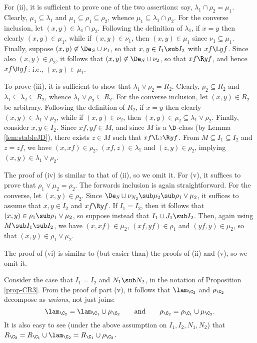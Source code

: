 For (ii), it is sufficient to prove one of the two assertions: say, $\lambda_1\cap \rho_2=\mu_1$.
Clearly, $\mu_1\subseteq \lambda_1$ and $\mu_1\subseteq \rho_1\subseteq \rho_2$, whence $\mu_1\subseteq \lambda_1\cap\rho_2$.
For the converse inclusion, let $(x,y)\in \lambda_1\cap\rho_2$.
Following the definition of $\lambda_1$, if $x=y$ then clearly $(x,y)\in \mu_1$, while if $(x,y)\in\nu_1$, then $(x,y)\in \mu_1$ since $\nu_1\subseteq\mu_1$.
Finally, suppose $(x,y)\not\in\De_S\cup\nu_1$, so that $x,y\in I_1\sub I_2$ with $xf\L yf$.
%
Since also $(x,y)\in\rho_2$, it follows that $(x,y)\not\in\De_S\cup\nu_2$, so that $xf\R yf$, and hence $xf\H yf$: i.e., $(x,y)\in\mu_1$.

To prove (iii), it is sufficient to show that $\lambda_1\vee\rho_2=R_2$.
Clearly, $\rho_2\subseteq R_2$ and $\lambda_1\subseteq \lambda_2\subseteq R_2$, whence $\lambda_1\vee\rho_2\subseteq R_2$.
For the converse inclusion, let $(x,y)\in R_2$ be arbitrary.
Following the definition of $R_2$, if $x=y$ then clearly $(x,y)\in \lambda_1\vee\rho_2$, while if $(x,y)\in \nu_2$, then
$(x,y)\in \rho_2\subseteq \lambda_1\vee\rho_2$.
Finally, consider $x,y\in I_2$.
Since $xf,yf\in M$, and since $M$ is a ${\D}$-class (by Lemma \ref{lem:stableJD}), there exists
$z\in M$ such that $xf\L z\R yf$.
From $M\subseteq I_1\subseteq I_2$ and $z=zf$, we have $(x,xf)\in\rho_2$,
$(xf,z)\in \lambda_1$ and $(z,y)\in \rho_2$, implying $(x,y)\in\lambda_1\vee\rho_2$. %

The proof of (iv) is similar to that of (ii), so we omit it.  For (v), it suffices to prove that $\rho_1\vee\mu_2=\rho_2$.  The forwards inclusion is again straightforward.  For the converse, let $(x,y)\in\rho_2$.  Since $\De_S\cup\nu_{N_2}\sub\mu_2\sub\rho_1\vee\mu_2$, it suffices to assume that $x,y\in I_2$ and $xf\R yf$.  If $I_1=I_2$, then it follows that $(x,y)\in\rho_1\sub\rho_1\vee\mu_2$, so suppose instead that $I_1\cup J_1\sub I_2$.  Then, again using $M\sub I_1\sub I_2$, we have $(x,xf)\in\mu_2$, $(xf,yf)\in\rho_1$ and $(yf,y)\in\mu_2$, so that $(x,y)\in\rho_1\vee\mu_2$.

The proof of (vi) is similar to (but easier than) the proofs of (ii) and (v), so we omit it.
\epf

\begin{rem}\label{rem:nonprincipal}
Consider the case that $I_1=I_2$ and $N_1\sub N_2$, in the notation of Proposition \ref{prop-CR3}.  From the proof of part (v), it follows that $\lam_{\C_2}$ and $\rho_{\C_2}$ decompose as \emph{unions}, not just joins:
\[
\lam_{\C_2} = \lam_{\C_1}\cup\mu_{\C_2} \qquad\text{and}\qquad \rho_{\C_2} = \rho_{\C_1}\cup\mu_{\C_2}.
\]
It is also easy to see (under the above assumption on $I_1,I_2,N_1,N_2$) that $R_{\C_2}=R_{\C_1}\cup\lam_{\C_2}=R_{\C_1}\cup\rho_{\C_2}$.
\end{rem}

